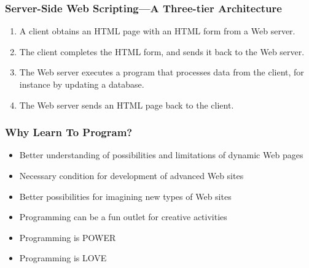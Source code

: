 \documentclass[dvipsnames]{beamer}
\begin{document}
\begin{frame}
\frametitle{Server-Side Web Scripting---A Three-tier Architecture}

\begin{center}
\end{center}


\begin{enumerate}
\item A client obtains an HTML page with an HTML form from a Web server.
\item<2-> The client completes the HTML form, and sends it back to the
  Web server.
\item<3-> The Web server executes a program that processes data from
  the client, for instance by updating a database.
\item<4-> The Web server sends an HTML page back to the client.
\end{enumerate}


\end{frame}



\begin{frame}
  \frametitle{Why Learn To Program?}
  \begin{itemize}
  \item Better understanding of possibilities and limitations of dynamic
    Web pages
  \item Necessary condition for development of advanced Web sites
  \item Better possibilities for imagining new types of Web sites
  \item<+-> Programming can be a fun outlet for creative activities
  \item<+-> Programming is POWER
  \item<+-> Programming is LOVE 
  \end{itemize}
\end{frame}
\end{document}
